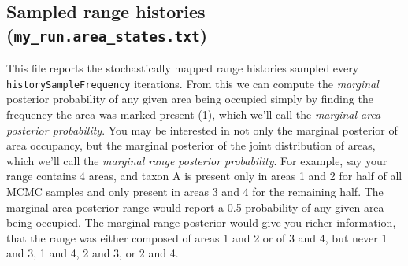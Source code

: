 \documentclass[11pt]{article}
\newcommand{\impmark}{\strut\vadjust{\domark}}
\newcommand{\domark}{%
  \vbox to 0pt{
    \kern-\dp\strutbox
    \smash{\llap{$\rightarrow$\kern1em}}
    \vss
  }%
}
\begin{document}
%
%
%
%

\subsection{Sampled range histories (\texttt{my\_run.area\_states.txt})}

This file reports the stochastically mapped range histories sampled every \texttt{historySampleFrequency} iterations.
From this we can compute the {\it marginal} posterior probability of any given area being occupied simply by finding the frequency the area was marked present (1), which we'll call the {\it marginal area posterior probability}.
You may be interested in not only the marginal posterior of area occupancy, but the marginal posterior of the joint distribution of areas, which we'll call the {\it marginal range posterior probability}.
For example, say your range contains 4 areas, and taxon A is present only in areas 1 and 2 for half of all MCMC samples and only present in areas 3 and 4 for the remaining half.
The marginal area posterior range would report a 0.5 probability of any given area being occupied.
The marginal range posterior would give you richer information, that the range was either composed of areas 1 and 2 or of 3 and 4, but never 1 and 3, 1 and 4, 2 and 3, or 2 and 4.
\end{document}
